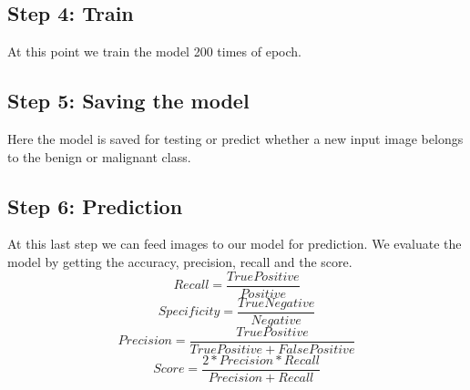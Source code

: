 \documentclass[12pt, letterpaper]{article}
\begin{document}
\subsection{Step 4: Train}
\par At this point we train the model 200 times of epoch.
\subsection{Step 5: Saving the model }
\par Here the model is saved for testing or predict whether a new input image belongs to the benign or malignant class.
\subsection{Step 6: Prediction}
\par At this last step we can feed images to our model for prediction. We evaluate the model by getting the accuracy, precision, recall and the score.
$$ Recall = \frac{TruePositive}{Positive }$$
$$ Specificity = \frac{TrueNegative}{Negative}$$
$$ Precision = \frac{TruePositive}{TruePositive + FalsePositive}$$
$$ Score = \frac{2*Precision*Recall}{Precision+Recall}$$
\end{document}
